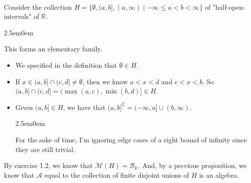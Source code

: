 \documentclass{book}
\newcommand{\hOne}{%
   \color{Black}%
   \fontsize{14}{16}\selectfont%
}
\newcommand{\hTwo}{%
\color{MidnightBlue}%
   \fontsize{13}{15}\selectfont%
}
\newcommand{\myComment}{%
   \color{RawerSienna}%
   \fontsize{12}{14}\selectfont%
}
\newenvironment{myIndent}{%
   \begin{adjustwidth}{2.5em}{0em}%
}{%
   \end{adjustwidth}%
}
\newcommand{\comp}{\mathsf{C}}
\newcommand{\mySepTwo}[1][.]{%
   {\noindent\color{#1}{\rule{6.5in}{0.5mm}}}\\%
}
\newcommand{\retTwo}{\hfill\bigbreak}
\begin{document}
\hOne\mySepTwo

Consider the collection $H = \{\emptyset, (a, b], (a, \infty) \mid -\infty \leq a < b < \infty\}$ of "half-open-intervals" of $\mathbb{R}$.

\begin{myIndent}\hTwo
   This forms an elementary family.
   \begin{itemize}
      \item We specified in the definition that $\emptyset \in H$.
      \item If $x \in (a, b] \cap (c, d] \neq \emptyset$, then we know $a < x < d$ and $c < x< b$. So\\ $(a, b] \cap (c, d] = (\max(a, c), \min(b, d)] \in H$.\newpage
      \item Given $(a, b] \in H$, we have that $(a , b]^\comp = (-\infty, a] \cup (b, \infty)$.
      \begin{myIndent}\myComment
         For the sake of time, I'm ignoring edge cases of a right bound of infinity since they are still trivial.\retTwo
      \end{myIndent}
   \end{itemize}
\end{myIndent}

By exercise 1.2, we know that $\mathcal{M}(H) = \mathcal{B}_{\mathbb{R}}$. And, by a previous proposition, we know that $\mathcal{A}$ equal to the collection of finite disjoint unions of $H$ is an algebra.\retTwo
\end{document}

